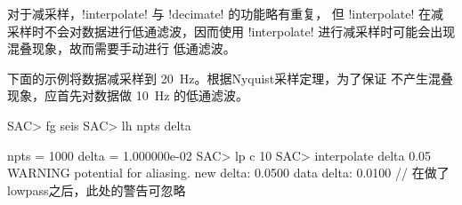 对于减采样，!interpolate! 与 !decimate! 的功能略有重复，
但 !interpolate! 在减采样时不会对数据进行低通滤波，因而使用 
!interpolate! 进行减采样时可能会出现混叠现象，故而需要手动进行
低通滤波。

下面的示例将数据减采样到 \SI{20}{\Hz}。根据Nyquist采样定理，为了保证
不产生混叠现象，应首先对数据做 \SI{10}{\Hz} 的低通滤波。
\begin{SACCode}
SAC> fg seis
SAC> lh npts delta

     npts = 1000
     delta = 1.000000e-02
SAC> lp c 10
SAC> interpolate delta 0.05
WARNING potential for aliasing. new delta: 0.0500 data delta: 0.0100
    //  在做了lowpass之后，此处的警告可忽略
\end{SACCode}
